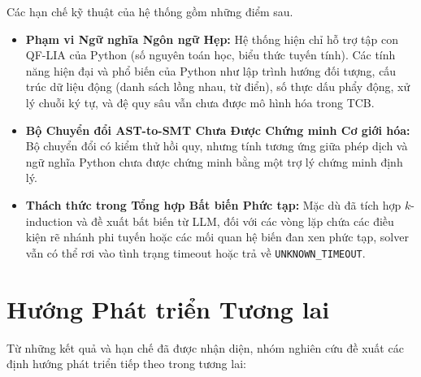 Các hạn chế kỹ thuật của hệ thống gồm những điểm sau.
\begin{itemize}
    \item \textbf{Phạm vi Ngữ nghĩa Ngôn ngữ Hẹp:} Hệ thống hiện chỉ hỗ trợ tập con QF-LIA của Python (số nguyên toán học, biểu thức tuyến tính). Các tính năng hiện đại và phổ biến của Python như lập trình hướng đối tượng, cấu trúc dữ liệu động (danh sách lồng nhau, từ điển), số thực dấu phẩy động, xử lý chuỗi ký tự, và đệ quy sâu vẫn chưa được mô hình hóa trong TCB.
    \item \textbf{Bộ Chuyển đổi AST-to-SMT Chưa Được Chứng minh Cơ giới hóa:} Bộ chuyển đổi có kiểm thử hồi quy, nhưng tính tương ứng giữa phép dịch và ngữ nghĩa Python chưa được chứng minh bằng một trợ lý chứng minh định lý.
    \item \textbf{Thách thức trong Tổng hợp Bất biến Phức tạp:} Mặc dù đã tích hợp $k$-induction và đề xuất bất biến từ LLM, đối với các vòng lặp chứa các điều kiện rẽ nhánh phi tuyến hoặc các mối quan hệ biến đan xen phức tạp, solver vẫn có thể rơi vào tình trạng timeout hoặc trả về \texttt{UNKNOWN\_TIMEOUT}.
\end{itemize}

\section{Hướng Phát triển Tương lai}
\label{sec:future_work}

Từ những kết quả và hạn chế đã được nhận diện, nhóm nghiên cứu đề xuất các định hướng phát triển tiếp theo trong tương lai:


